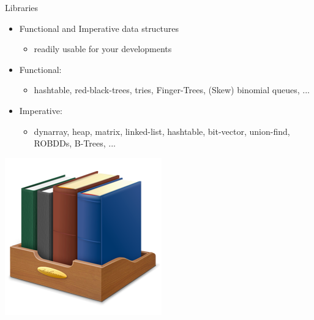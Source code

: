 \documentclass[fleqn]{beamer}
\begin{document}
\begin{frame}{Libraries}
  \begin{itemize}
   \item Functional and Imperative data structures
    \begin{itemize}
     \item readily usable for your developments

    \end{itemize}
   \item Functional:
    \begin{itemize}
     \item hashtable, red-black-trees, tries, Finger-Trees, (Skew) binomial queues, ...

    \end{itemize}
   \item Imperative:
    \begin{itemize}
     \item dynarray, heap, matrix, linked-list, hashtable, bit-vector, union-find, ROBDDs, B-Trees, ...

    \end{itemize}
  \end{itemize}
  \includegraphics[height=.2\textheight]{books.png}


\end{frame}
\end{document}
